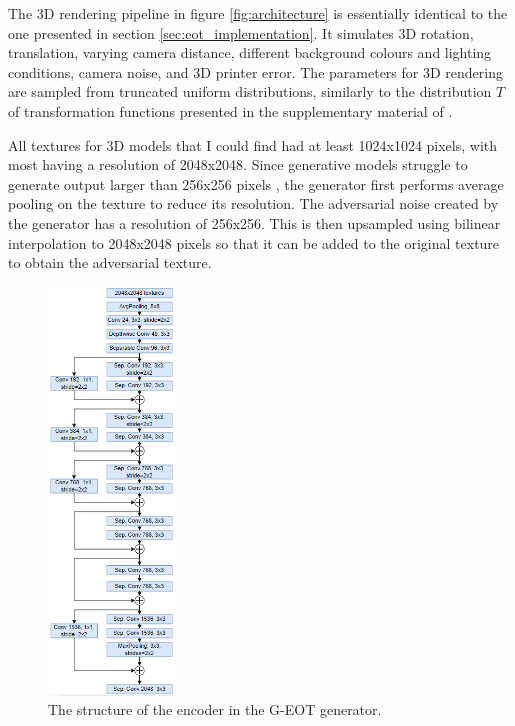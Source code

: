 The 3D rendering pipeline in figure \ref{fig:architecture} is essentially identical to the one presented in section \ref{sec:eot_implementation}. It simulates 3D rotation, translation, varying camera distance, different background colours and lighting conditions, camera noise, and 3D printer error. The parameters for 3D rendering are sampled from truncated uniform distributions, similarly to the distribution $T$ of transformation functions presented in the supplementary material of \cite{athalye}. 

All textures for 3D models that I could find had at least 1024x1024 pixels, with most having a resolution of 2048x2048. Since generative models struggle to generate output larger than 256x256 pixels \cite{big_gan}, the generator first performs average pooling on the texture to reduce its resolution. The adversarial noise created by the generator has a resolution of 256x256. This is then upsampled using bilinear interpolation to 2048x2048 pixels so that it can be added to the original texture to obtain the adversarial texture.

\begin{figure}
    \centering
    \includegraphics[width=0.3\textwidth]{graphics/g_eot_encoder.PNG}
    \caption{The structure of the encoder in the G-EOT generator.}
    \label{fig:proposed_encoder}
\end{figure}

